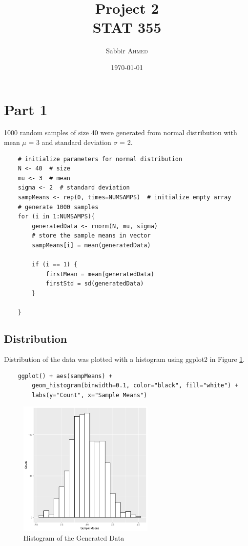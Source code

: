 \documentclass{article}
\title{Project 2 \\ STAT 355} %
\author{Sabbir \textsc{Ahmed}} %
\date{\today} %
\begin{document}
    \maketitle %

    \section{Part 1}
        1000 random samples of size 40 were generated from normal distribution with mean $\mu$ = 3 and standard deviation $\sigma$ = 2.

\begin{lstlisting}
    # initialize parameters for normal distribution
    N <- 40  # size
    mu <- 3  # mean
    sigma <- 2  # standard deviation
    sampMeans <- rep(0, times=NUMSAMPS)  # initialize empty array
    # generate 1000 samples
    for (i in 1:NUMSAMPS){
        generatedData <- rnorm(N, mu, sigma)
        # store the sample means in vector
        sampMeans[i] = mean(generatedData)

        if (i == 1) {
            firstMean = mean(generatedData)
            firstStd = sd(generatedData)
        }

    }
\end{lstlisting}

        

        \subsection{Distribution}
            Distribution of the data was plotted with a histogram using ggplot2 in Figure \ref{fig:hist1}.
\begin{lstlisting}
    ggplot() + aes(sampMeans) + 
        geom_histogram(binwidth=0.1, color="black", fill="white") +
        labs(y="Count", x="Sample Means")
\end{lstlisting}

            \begin{figure}[h]
                \begin{center}
                    \includegraphics[width=0.6\textwidth]{figures/hist1.png}
                    \caption{Histogram of the Generated Data} \label{fig:hist1}
                \end{center}
            \end{figure}
\end{document}
